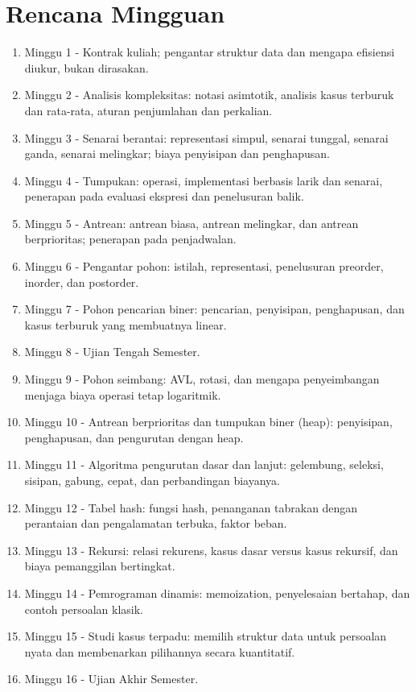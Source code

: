 \section*{Rencana Mingguan}

\begin{enumerate}
  \item Minggu 1 - Kontrak kuliah; pengantar struktur data dan mengapa
        efisiensi diukur, bukan dirasakan.
  \item Minggu 2 - Analisis kompleksitas: notasi asimtotik, analisis kasus
        terburuk dan rata-rata, aturan penjumlahan dan perkalian.
  \item Minggu 3 - Senarai berantai: representasi simpul, senarai tunggal,
        senarai ganda, senarai melingkar; biaya penyisipan dan penghapusan.
  \item Minggu 4 - Tumpukan: operasi, implementasi berbasis larik dan
        senarai, penerapan pada evaluasi ekspresi dan penelusuran balik.
  \item Minggu 5 - Antrean: antrean biasa, antrean melingkar, dan antrean
        berprioritas; penerapan pada penjadwalan.
  \item Minggu 6 - Pengantar pohon: istilah, representasi, penelusuran
        preorder, inorder, dan postorder.
  \item Minggu 7 - Pohon pencarian biner: pencarian, penyisipan, penghapusan,
        dan kasus terburuk yang membuatnya linear.
  \item Minggu 8 - Ujian Tengah Semester.
  \item Minggu 9 - Pohon seimbang: AVL, rotasi, dan mengapa penyeimbangan
        menjaga biaya operasi tetap logaritmik.
  \item Minggu 10 - Antrean berprioritas dan tumpukan biner (heap):
        penyisipan, penghapusan, dan pengurutan dengan heap.
  \item Minggu 11 - Algoritma pengurutan dasar dan lanjut: gelembung,
        seleksi, sisipan, gabung, cepat, dan perbandingan biayanya.
  \item Minggu 12 - Tabel hash: fungsi hash, penanganan tabrakan dengan
        perantaian dan pengalamatan terbuka, faktor beban.
  \item Minggu 13 - Rekursi: relasi rekurens, kasus dasar versus kasus
        rekursif, dan biaya pemanggilan bertingkat.
  \item Minggu 14 - Pemrograman dinamis: memoization, penyelesaian
        bertahap, dan contoh persoalan klasik.
  \item Minggu 15 - Studi kasus terpadu: memilih struktur data untuk
        persoalan nyata dan membenarkan pilihannya secara kuantitatif.
  \item Minggu 16 - Ujian Akhir Semester.
\end{enumerate}

